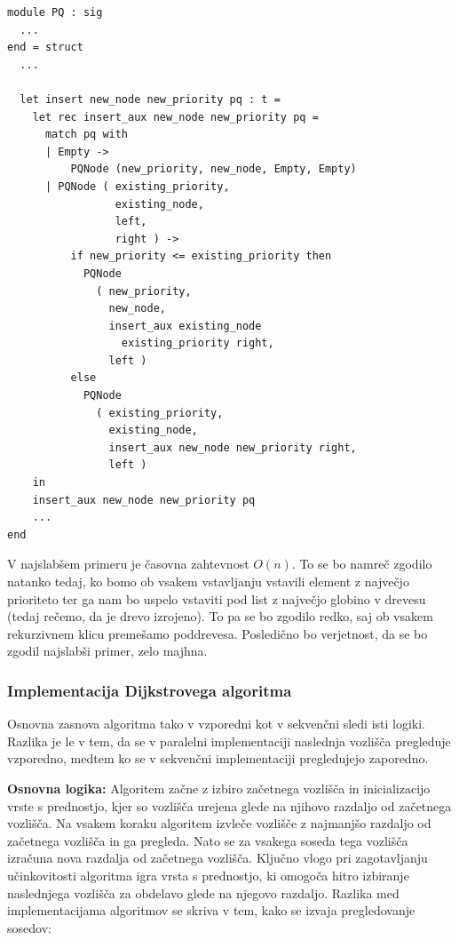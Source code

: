 \documentclass[mat1, tisk]{fmfdelo}
\begin{document}
\begin{lstlisting}[label=lst:pq_insert]
module PQ : sig
  ...
end = struct
  ...

  let insert new_node new_priority pq : t =
    let rec insert_aux new_node new_priority pq =
      match pq with
      | Empty -> 
          PQNode (new_priority, new_node, Empty, Empty)
      | PQNode ( existing_priority, 
                 existing_node, 
                 left, 
                 right ) ->
          if new_priority <= existing_priority then
            PQNode
              ( new_priority,
                new_node,
                insert_aux existing_node 
                  existing_priority right,
                left )
          else
            PQNode
              ( existing_priority,
                existing_node,
                insert_aux new_node new_priority right,
                left )
    in
    insert_aux new_node new_priority pq
    ...
end
\end{lstlisting}

V najslabšem primeru je časovna zahtevnost $O(n)$. To se bo namreč zgodilo natanko tedaj, ko bomo ob vsakem vstavljanju
vstavili element z največjo prioriteto ter ga nam bo uspelo vstaviti pod list z največjo globino v drevesu (tedaj
rečemo, da je drevo izrojeno). To pa se bo zgodilo redko, saj ob vsakem rekurzivnem klicu premešamo poddrevesa.
Posledično bo verjetnost, da se bo zgodil najslabši primer, zelo majhna.

\subsubsection{Implementacija Dijkstrovega algoritma}

Osnovna zasnova algoritma tako v vzporedni kot v sekvenčni sledi isti logiki. Razlika je le v tem, da se v paralelni
implementaciji naslednja vozlišča pregleduje vzporedno, medtem ko se v sekvenčni implementaciji pregledujejo zaporedno.

\textbf{Osnovna logika: } Algoritem začne z izbiro začetnega vozlišča in inicializacijo vrste s prednostjo, kjer so
vozlišča urejena glede na njihovo razdaljo od začetnega vozlišča. Na vsakem koraku algoritem izvleče vozlišče z najmanjšo
razdaljo od začetnega vozlišča in ga pregleda. Nato se za vsakega soseda tega vozlišča izračuna nova razdalja od začetnega
vozlišča. Ključno vlogo pri zagotavljanju učinkovitosti algoritma igra vrsta s prednostjo, ki omogoča hitro izbiranje
naslednjega vozlišča za obdelavo glede na njegovo razdaljo. Razlika med implementacijama algoritmov se skriva v tem,
kako se izvaja pregledovanje sosedov:
\end{document}
